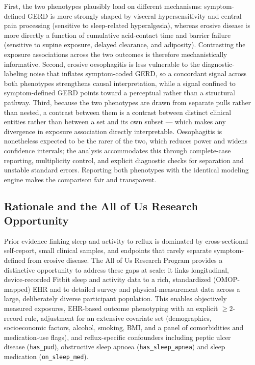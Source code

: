 \documentclass[11pt]{article}
\newcommand{\code}[1]{\texttt{\small #1}}
\begin{document}
First, the two phenotypes plausibly load on different mechanisms: symptom-defined GERD is more strongly shaped by visceral hypersensitivity and central pain processing (sensitive to sleep-related hyperalgesia), whereas erosive disease is more directly a function of cumulative acid-contact time and barrier failure (sensitive to supine exposure, delayed clearance, and adiposity). Contrasting the exposure associations across the two outcomes is therefore mechanistically informative. Second, erosive oesophagitis is less vulnerable to the diagnostic-labeling noise that inflates symptom-coded GERD, so a concordant signal across both phenotypes strengthens causal interpretation, while a signal confined to symptom-defined GERD points toward a perceptual rather than a structural pathway. Third, because the two phenotypes are drawn from separate pulls rather than nested, a contrast between
them is a contrast between distinct clinical entities rather than between a set and its own subset ---
which makes any divergence in exposure association directly interpretable. Oesophagitis is nonetheless
expected to be the rarer of the two, which reduces power and widens confidence intervals; the analysis
accommodates this through complete-case reporting, multiplicity control, and explicit diagnostic checks
for separation and unstable standard errors. Reporting both phenotypes with the identical modeling engine makes the comparison fair and transparent.

\subsection{Rationale and the All of Us Research Opportunity}

Prior evidence linking sleep and activity to reflux is dominated by cross-sectional self-report, small clinical samples, and endpoints that rarely separate symptom-defined from erosive disease. The All of Us Research Program provides a distinctive opportunity to address these gaps at scale: it links longitudinal, device-recorded Fitbit sleep and activity data to a rich, standardized (OMOP-mapped) EHR and to detailed survey and physical-measurement data across a large, deliberately diverse participant population. This enables objectively measured exposures, EHR-based outcome phenotyping with an explicit $\geq 2$-record rule, adjustment for an extensive covariate set (demographics, socioeconomic factors, alcohol, smoking, BMI, and a panel of comorbidities and medication-use flags), and reflux-specific confounders including peptic ulcer disease (\code{has_pud}), obstructive sleep apnoea (\code{has_sleep_apnea}) and sleep medication (\code{on_sleep_med}).
\end{document}
